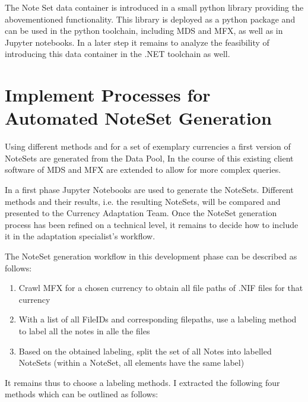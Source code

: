 The Note Set data container is introduced in a small python library providing the abovementioned functionality. This library is deployed as a python package and can be used in the python toolchain, including MDS and MFX, as well as in Jupyter notebooks. In a later step it remains to analyze the feasibility of introducing this data container in the .NET toolchain as well.

\section{Implement Processes for Automated NoteSet Generation}
Using different methods and for a set of exemplary currencies a first version of NoteSets are generated from the Data Pool, In the course of this existing client software of MDS and MFX are extended to allow for more complex queries.\par
In a first phase Jupyter Notebooks are used to generate the NoteSets. Different methods and their results, i.e. the resulting NoteSets, will be compared and presented to the Currency Adaptation Team. Once the NoteSet generation process has been refined on a technical level, it remains to decide how to include it in the adaptation specialist's workflow.\par
The NoteSet generation workflow in this development phase can be described as follows: 
\begin{enumerate}
\item Crawl MFX for a chosen currency to obtain all file paths of .NIF files for that currency
\item With a list of all FileIDs and corresponding filepaths, use a labeling method to label all the notes in alle the files
\item Based on the obtained labeling, split the set of all Notes into labelled NoteSets (within a NoteSet, all elements have the same label)
\end{enumerate}
It remains thus to choose a labeling methods. I extracted the following four methods which can be outlined as follows:
